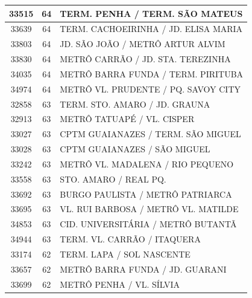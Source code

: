 \documentclass[
	12pt,				%
	oneside,			%
	a4paper,			%
	english,			%
	brazil				%
	]{abntex2ppgsi}
\begin{document}
{{\begin{apendicesenv}
\begin{longtable}{c|c|p{7cm}}
    33515 & 64    & TERM. PENHA / TERM. SÃO MATEUS \\
\hline

    33639 & 64    & TERM. CACHOEIRINHA / JD. ELISA MARIA \\
\hline

    33803 & 64    & JD. SÃO JOÃO  / METRÔ ARTUR ALVIM \\
\hline

    33830 & 64    & METRÔ CARRÃO / JD. STA. TEREZINHA \\
\hline

    34035 & 64    & METRÔ BARRA FUNDA / TERM. PIRITUBA \\
\hline

    34974 & 64    & METRÔ VL. PRUDENTE / PQ. SAVOY CITY \\
\hline

    32858 & 63    & TERM. STO. AMARO / JD. GRAUNA \\
\hline

    32913 & 63    & METRÔ TATUAPÉ / VL. CISPER \\
\hline

    33027 & 63    & CPTM GUAIANAZES / TERM. SÃO MIGUEL \\
\hline

    33028 & 63    & CPTM GUAIANAZES / SÃO MIGUEL \\
\hline

    33242 & 63    & METRÔ VL. MADALENA / RIO PEQUENO \\
\hline

    33558 & 63    & STO. AMARO / REAL PQ. \\
\hline

    33692 & 63    & BURGO PAULISTA / METRÔ PATRIARCA \\
\hline

    33695 & 63    & VL. RUI BARBOSA / METRÔ VL. MATILDE \\
\hline

    34853 & 63    & CID. UNIVERSITÁRIA / METRÔ BUTANTÃ \\
\hline

    34944 & 63    & TERM. VL. CARRÃO / ITAQUERA \\
\hline

    33174 & 62    & TERM. LAPA / SOL NASCENTE \\
\hline

    33657 & 62    & METRÔ BARRA FUNDA / JD. GUARANI \\
\hline

    33699 & 62    & METRÔ PENHA / VL. SÍLVIA \\
\hline


\end{longtable}
\end{apendicesenv}}}
\end{document}
